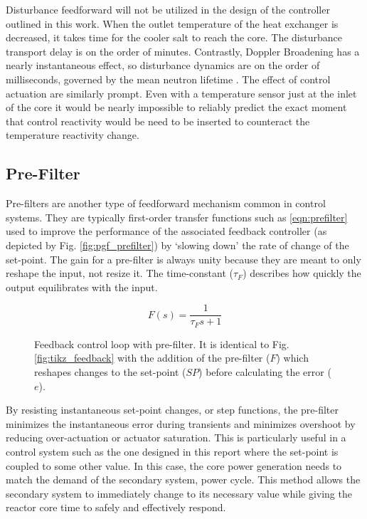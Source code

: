 Disturbance feedforward will not be utilized in the design of the controller outlined in this work. When the outlet temperature of the heat exchanger is decreased, it takes time for the cooler salt to reach the core. The disturbance transport delay is on the order of minutes. Contrastly, Doppler Broadening has a nearly instantaneous effect, so disturbance dynamics are on the order of milliseconds, governed by the mean neutron lifetime \cite[Ch. 7]{Lamarsh}. The effect of control actuation are similarly prompt. Even with a temperature sensor just at the inlet of the core it would be nearly impossible to reliably predict the exact moment that control reactivity would be need to be inserted to counteract the temperature reactivity change. 

\subsection{Pre-Filter}
 Pre-filters are another type of feedforward mechanism common in control systems. They are typically first-order transfer functions such as \ref{eqn:prefilter} used to improve the performance of the associated feedback controller (as depicted by Fig. \ref{fig:pgf_prefilter}) by `slowing down' the rate of change of the set-point. The gain for a pre-filter is always unity because they are meant to only reshape the input, not resize it. The time-constant ($\tau_F$) describes how quickly the output equilibrates with the input. 

\begin{equation}\label{eqn:prefilter}
    F(s)=\frac{1}{\tau_F s+1}    
\end{equation}

\begin{figure}[!ht]
    \centering
    
    \caption[Feedback control loop with pre-filter]{Feedback control loop with pre-filter. It is identical to Fig. \ref{fig:tikz_feedback} with the addition of the pre-filter ($F$) which reshapes changes to the set-point ($SP$) before calculating the error ($e$).}
    \label{fig:tikz_prefilter}
\end{figure}

By resisting instantaneous set-point changes, or step functions, the pre-filter minimizes the instantaneous error during transients and minimizes overshoot by reducing over-actuation or actuator saturation.  This is particularly useful in a control system such as the one designed in this report where the set-point is coupled to some other value. In this case, the core power generation needs to match the demand of the secondary system, \eg power cycle. This method allows the secondary system to immediately change to its necessary value while giving the reactor core time to safely and effectively respond. 

